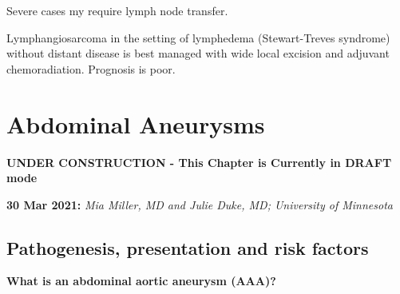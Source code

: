 \documentclass[
]{book}
\begin{document}
Severe cases my require lymph node transfer.\citep{warren2007}

Lymphangiosarcoma in the setting of lymphedema (Stewart-Treves syndrome)
without distant disease is best managed with wide local excision and
adjuvant chemoradiation. Prognosis is poor.\citep{sharma2012}

\hypertarget{abdominal-aneurysms}{%
\chapter{Abdominal Aneurysms}\label{abdominal-aneurysms}}

\textbf{UNDER CONSTRUCTION - This Chapter is Currently in DRAFT mode}

\textbf{30 Mar 2021:} \emph{Mia Miller, MD and Julie Duke, MD; University of
Minnesota}

\hypertarget{pathogenesis-presentation-and-risk-factors}{%
\section{Pathogenesis, presentation and risk factors}\label{pathogenesis-presentation-and-risk-factors}}

\textbf{What is an abdominal aortic aneurysm (AAA)?}
\citep{mooreVascularEndovascularSurgery2019}
\end{document}
